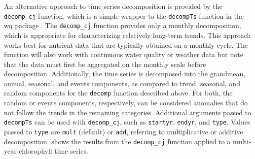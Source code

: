 \documentclass[10pt,letterpaper]{article}\usepackage[]{graphicx}\usepackage[]{color}
\begin{document}
An alternative approach to time series decomposition is provided by the \texttt{decomp\_cj} function, which is a simple wrapper to the \texttt{decompTs} function in the wq package \cite{Cloern10,Jassby14}.  The \texttt{decomp\_cj} function provides only a monthly decomposition, which is appropriate for characterizing relatively long-term trends.  This approach works best for nutrient data that are typically obtained on a monthly cycle.  The function will also work with continuous water quality or weather data but note that the data must first be aggregated on the monthly scale before decomposition.  Additionally, the time series is decomposed into the grandmean, annual, seasonal, and events components, as compared to trend, seasonal, and random components for the \texttt{decomp} function described above.  For both, the random or events components, respectively, can be considered anomalies that do not follow the trends in the remaining categories.  Additional arguments passed to \texttt{decompTs} can be used with \texttt{decomp\_cj}, such as \texttt{startyr}, \texttt{endyr}, and \texttt{type}.  Values passed to \texttt{type} are \texttt{mult} (default) or \texttt{add}, referring to multiplicative or additive decomposition.   shows the results from the \texttt{decomp\_cj} function applied to a multi-year chlorophyll time series.
\end{document}

